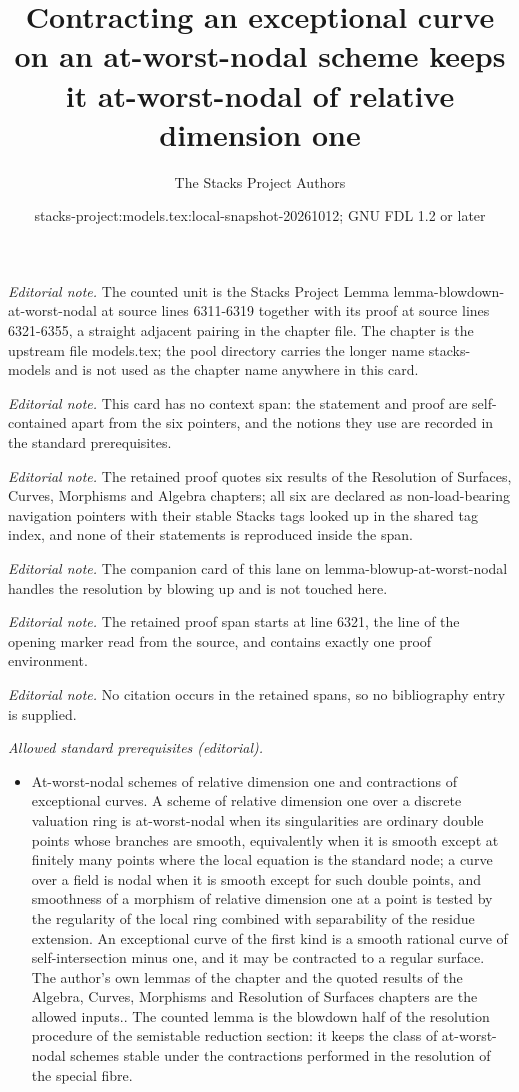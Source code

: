 \documentclass[10pt,a4paper]{amsart}
\title{Contracting an exceptional curve on an at-worst-nodal scheme keeps it at-worst-nodal of relative dimension one}
\author{The Stacks Project Authors}
\date{stacks-project:models.tex:local-snapshot-20261012; GNU FDL 1.2 or later}
\theoremstyle{plain}
\theoremstyle{definition}
\theoremstyle{remark}
\numberwithin{equation}{subsection}
\begin{document}
\maketitle
\noindent\textit{Editorial note.} The counted unit is the Stacks Project Lemma lemma-blowdown-at-worst-nodal at source lines 6311-6319 together with its proof at source lines 6321-6355, a straight adjacent pairing in the chapter file. The chapter is the upstream file models.tex; the pool directory carries the longer name stacks-models and is not used as the chapter name anywhere in this card.\par\medskip
\noindent\textit{Editorial note.} This card has no context span: the statement and proof are self-contained apart from the six pointers, and the notions they use are recorded in the standard prerequisites.\par\medskip
\noindent\textit{Editorial note.} The retained proof quotes six results of the Resolution of Surfaces, Curves, Morphisms and Algebra chapters; all six are declared as non-load-bearing navigation pointers with their stable Stacks tags looked up in the shared tag index, and none of their statements is reproduced inside the span.\par\medskip
\noindent\textit{Editorial note.} The companion card of this lane on lemma-blowup-at-worst-nodal handles the resolution by blowing up and is not touched here.\par\medskip
\noindent\textit{Editorial note.} The retained proof span starts at line 6321, the line of the opening marker read from the source, and contains exactly one proof environment.\par\medskip
\noindent\textit{Editorial note.} No citation occurs in the retained spans, so no bibliography entry is supplied.\par\medskip
\noindent\textit{Allowed standard prerequisites (editorial).}\begin{itemize}
\item At-worst-nodal schemes of relative dimension one and contractions of exceptional curves. A scheme of relative dimension one over a discrete valuation ring is at-worst-nodal when its singularities are ordinary double points whose branches are smooth, equivalently when it is smooth except at finitely many points where the local equation is the standard node; a curve over a field is nodal when it is smooth except for such double points, and smoothness of a morphism of relative dimension one at a point is tested by the regularity of the local ring combined with separability of the residue extension. An exceptional curve of the first kind is a smooth rational curve of self-intersection minus one, and it may be contracted to a regular surface. The author's own lemmas of the chapter and the quoted results of the Algebra, Curves, Morphisms and Resolution of Surfaces chapters are the allowed inputs.. The counted lemma is the blowdown half of the resolution procedure of the semistable reduction section: it keeps the class of at-worst-nodal schemes stable under the contractions performed in the resolution of the special fibre.
\end{itemize}\medskip
\end{document}
